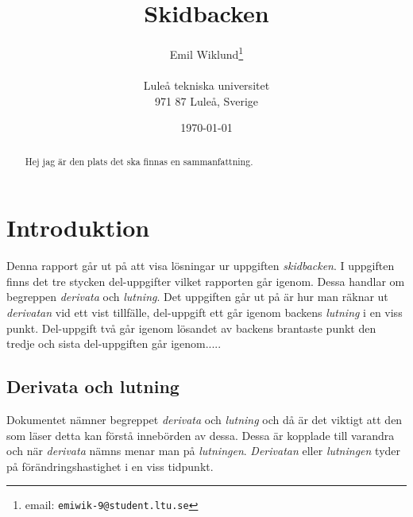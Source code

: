\documentclass[a4paper,12pt]{article}
\title{Skidbacken}
\author{Emil Wiklund\thanks{email: \texttt{emiwik-9@student.ltu.se}}\\  
        ~ \\
        Luleå tekniska universitet \\ 
        971 87 Luleå, Sverige}
\date{\today}
\begin{document}
\linenumbers
\maketitle


\begin{abstract}

  Hej jag är den plats det ska finnas en sammanfattning.
\end{abstract}


\section{Introduktion}
\label{sec:introduktion}






Denna rapport går ut på att visa lösningar ur uppgiften \emph{skidbacken}.
I uppgiften finns det tre stycken del-uppgifter vilket rapporten går igenom.
Dessa handlar om begreppen \emph{derivata} och \emph{lutning}.
Det uppgiften går ut på är hur man räknar ut \emph{derivatan} vid ett vist 
tillfälle, del-uppgift ett går igenom backens \emph{lutning} i en viss punkt.
Del-uppgift två går igenom lösandet av backens brantaste punkt den tredje 
och sista del-uppgiften går igenom.....


\subsection{Derivata och lutning}


Dokumentet nämner begreppet \emph{derivata} och \emph{lutning} och då är
det viktigt att den som läser detta kan förstå innebörden av dessa. Dessa är 
kopplade till varandra och när \emph{derivata} nämns menar man på 
\emph{lutningen}. \emph{Derivatan} eller \emph{lutningen} tyder på 
förändringshastighet i en viss tidpunkt.
\end{document}
